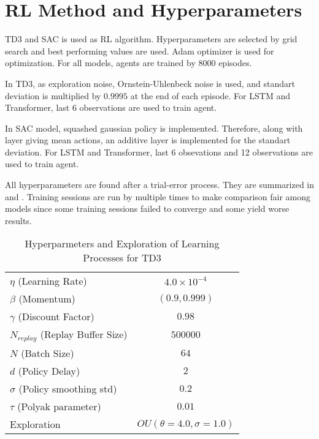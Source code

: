 \section{RL Method and Hyperparameters}
\label{sec:rlmethod}

TD3 and SAC is used as RL algorithm. 
Hyperparameters are selected by grid search and best performing values are used. Adam optimizer is used for optimization. 
For all models, agents are trained by 8000 episodes.

In TD3, as exploration noise, Ornstein-Uhlenbeck noise is used, and standart deviation is multiplied  by $0.9995$ at the end of each episode. For LSTM and Transformer, last 6 observations are used to train agent. 

In SAC model, squashed gaussian policy is implemented. 
Therefore, along with layer giving mean actions, an additive layer is implemented for the standart deviation. 
For LSTM and Transformer, last 6 obsevations and 12 observations are used to train agent. 

All hyperparameters are found after a trial-error process. They  are summarized in  and . 
Training sessions are run by multiple times to make comparison fair among models since some training sessions failed to converge and some yield worse results.

\begin{table}
	\caption{Hyperparmeters and Exploration of Learning Processes for TD3}
	\begin{tabular}{|l||*{3}{c|}}\hline
		\backslashbox{Hyperparameter}{Model}
		&\makebox[5em]{RFFNN}&\makebox[5em]{LSTM}&\makebox[5em]{Transformer}\\\hline\hline
		$\eta$ (Learning Rate) & \multicolumn{3}{|c|}{$4.0\times10^{-4}$}\\\hline
		$\beta$ (Momentum) & \multicolumn{3}{|c|}{$(0.9, 0.999)$}\\\hline
		$\gamma$ (Discount Factor) & \multicolumn{3}{|c|}{$0.98$} \\\hline
		$N_{replay}$ (Replay Buffer Size) &\multicolumn{3}{|c|}{$500000$} \\\hline
		$N$ (Batch Size) &\multicolumn{3}{|c|}{$64$}\\\hline
		$d$ (Policy Delay) &\multicolumn{3}{|c|}{$2$}\\\hline
		$\sigma$ (Policy smoothing std) &\multicolumn{3}{|c|}{$0.2$}\\\hline
		$\tau$ (Polyak parameter) &\multicolumn{3}{|c|}{$0.01$}\\\hline
		Exploration &\multicolumn{3}{|c|}{$OU(\theta=4.0, \sigma=1.0)$}\\\hline
	\end{tabular}
	\label{table:hyperparams_td3}
\end{table}
\noindent


